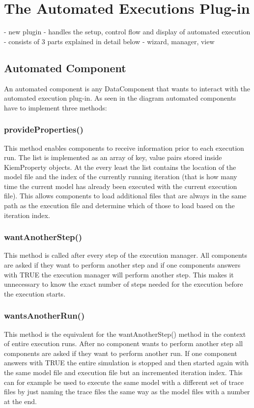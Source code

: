 \chapter{The Automated Executions Plug-in}
- new plugin
- handles the setup, control flow and display of automated execution
- consists of 3 parts explained in detail below
- wizard, manager, view

\section{Automated Component}
An automated component is any DataComponent that wants to interact with
the automated execution plug-in. As seen in the diagram automated components
have to implement three methods:

\subsection{provideProperties()}
This method enables components to receive information prior to each execution
run. The list is implemented as an array of key, value pairs stored inside
KiemProperty objects.
At the every least the list contains the location of the model file and the
index of the currently running iteration (that is how many time the current
model has already been executed with the current execution file).
This allows components to load additional files that are always in the
same path as the execution file and determine which of those to load
based on the iteration index.

\subsection{wantAnotherStep()}
This method is called after every step of the execution manager.
All components are asked if they want to perform another step and if
one components answers with TRUE the execution manager will perform another
step.
This makes it unnecessary to know the exact number of steps needed for
the execution before the execution starts.

\subsection{wantsAnotherRun()}
This method is the equivalent for the wantAnotherStep() method in the context
of entire execution runs.
After no component wants to perform another step all components are asked
if they want to perform another run. If one component answers with TRUE
the entire simulation is stopped and then started again with the same
model file and execution file but an incremented iteration index.
This can for example be used to execute the same model with a different
set of trace files by just naming the trace files the same way as the
model files with a number at the end.

